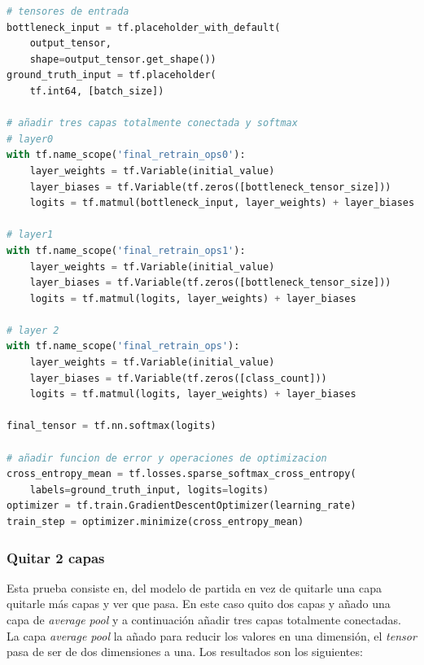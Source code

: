 \documentclass[12pt,a4paper]{article}
\begin{document}
\begin{lstlisting}[language=Python]
# tensores de entrada
bottleneck_input = tf.placeholder_with_default(
    output_tensor,
    shape=output_tensor.get_shape())
ground_truth_input = tf.placeholder(
    tf.int64, [batch_size])

# añadir tres capas totalmente conectada y softmax
# layer0
with tf.name_scope('final_retrain_ops0'):
    layer_weights = tf.Variable(initial_value)
    layer_biases = tf.Variable(tf.zeros([bottleneck_tensor_size]))
    logits = tf.matmul(bottleneck_input, layer_weights) + layer_biases

# layer1
with tf.name_scope('final_retrain_ops1'):
    layer_weights = tf.Variable(initial_value)
    layer_biases = tf.Variable(tf.zeros([bottleneck_tensor_size]))
    logits = tf.matmul(logits, layer_weights) + layer_biases

# layer 2
with tf.name_scope('final_retrain_ops'):
    layer_weights = tf.Variable(initial_value)
    layer_biases = tf.Variable(tf.zeros([class_count]))
    logits = tf.matmul(logits, layer_weights) + layer_biases

final_tensor = tf.nn.softmax(logits)

# añadir funcion de error y operaciones de optimizacion
cross_entropy_mean = tf.losses.sparse_softmax_cross_entropy(
    labels=ground_truth_input, logits=logits)
optimizer = tf.train.GradientDescentOptimizer(learning_rate)
train_step = optimizer.minimize(cross_entropy_mean)
\end{lstlisting}


\subsubsection{Quitar 2 capas}
Esta prueba consiste en, del modelo de partida en vez de quitarle una capa quitarle más capas y ver que pasa. En este caso quito dos capas y añado una capa de \textit{average pool} y a continuación añadir tres capas totalmente conectadas. La capa \textit{average pool} la añado para reducir los valores en una dimensión, el \textit{tensor} pasa de ser de dos dimensiones a una. Los resultados son los siguientes:
\end{document}
